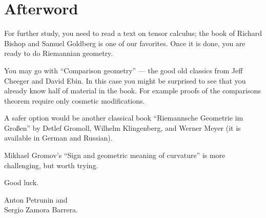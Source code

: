 \chapter*{Afterword}



For further study, you need to read a text on tensor calculus; the book of Richard Bishop and Samuel Goldberg \cite{bishop-goldberg} is one of our favorites.
Once it is done, you are ready to do Riemannian geometry.

You may go with  ``Comparison geometry'' \cite{cheeger-ebin} --- the good old classics from Jeff Cheeger and David Ebin. 
In this case you might be surprised to see that you already know half of material in the book.
For example proofs of the comparisons theorem require only cosmetic modifications.

A safer option would be another classical book ``Riemannsche Geometrie im Großen'' \cite{gromoll-klingenberg-meyer} by 
Detlef Gromoll,
Wilhelm Klingenberg, 
and  Werner Meyer (it is available in German and Russian).

Mikhael Gromov's ``Sign and geometric meaning of curvature'' \cite{gromov-1991} is more challenging, but worth trying. 

Good luck.

\begin{flushright}
Anton Petrunin and\\
Sergio Zamora Barrera.
\end{flushright}
